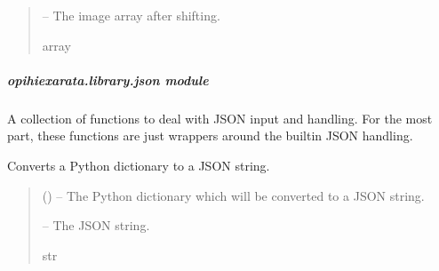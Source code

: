 \documentclass[letterpaper,11pt,english]{sphinxmanual}
\begin{document}
\begin{savenotes}
\begin{fulllineitems}
\begin{quote}
\begin{description}
\begin{itemize}
\end{itemize}

\sphinxAtStartPar
{} – The image array after shifting.

\sphinxAtStartPar
array

\end{description}\end{quote}

\end{fulllineitems}\end{savenotes}


\sphinxstepscope


\subparagraph{opihiexarata.library.json module}
\label{\detokenize{code/opihiexarata.library.json:module-opihiexarata.library.json}}\label{\detokenize{code/opihiexarata.library.json:opihiexarata-library-json-module}}\label{\detokenize{code/opihiexarata.library.json::doc}}
\sphinxAtStartPar
A collection of functions to deal with JSON input and handling. For the
most part, these functions are just wrappers around the built\sphinxhyphen{}in JSON handling.

\begin{savenotes}\begin{fulllineitems}
\label{\detokenize{code/opihiexarata.library.json:opihiexarata.library.json.dictionary_to_json}}
\pysigstartsignatures
{}
\pysigstopsignatures
\sphinxAtStartPar
Converts a Python dictionary to a JSON string.
\begin{quote}\begin{description}
\sphinxAtStartPar
{} () – The Python dictionary which will be converted to a JSON string.

\sphinxAtStartPar
{} – The JSON string.

\sphinxAtStartPar
str

\end{description}\end{quote}

\end{fulllineitems}\end{savenotes}
\end{document}
